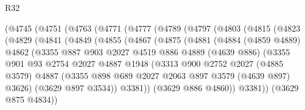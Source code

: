 \begin{lexlean}{R32}
\begin{coremodule}
        (@4745
          (@4751
            (@4763
              (@4771
                (@4777
                  (@4789
                    (@4797
                      (@4803
                        (@4815
                          (@4823
                            (@4829
                              (@4841
                                (@4849
                                  (@4855
                                    (@4867
                                      (@4875
                                        (@4881
                                          (@4884
                                            (@4859 @4889)
                                            @4862
                                            (@3355
                                              @887
                                              @903
                                              @2027
                                              @4519
                                              @886
                                              @4889
                                              (@4639 @886)
                                              (@3355
                                                @901
                                                @93
                                                @2754
                                                @2027
                                                @4887
                                                @1948
                                                (@3313
                                                  @900
                                                  @2752
                                                  @2027
                                                  (@4885 @3579)
                                                  @4887
                                                  (@3355
                                                    @898
                                                    @689
                                                    @2027
                                                    @2063
                                                    @897
                                                    @3579
                                                    (@4639 @897)
                                                    @3626)
                                                  (@3629 @897 @3534))
                                                @3381))
                                            (@3629 @886 @4860))
                                          @3381))
                                      (@3629 @875 @4834))

\end{coremodule}
\end{lexlean}
